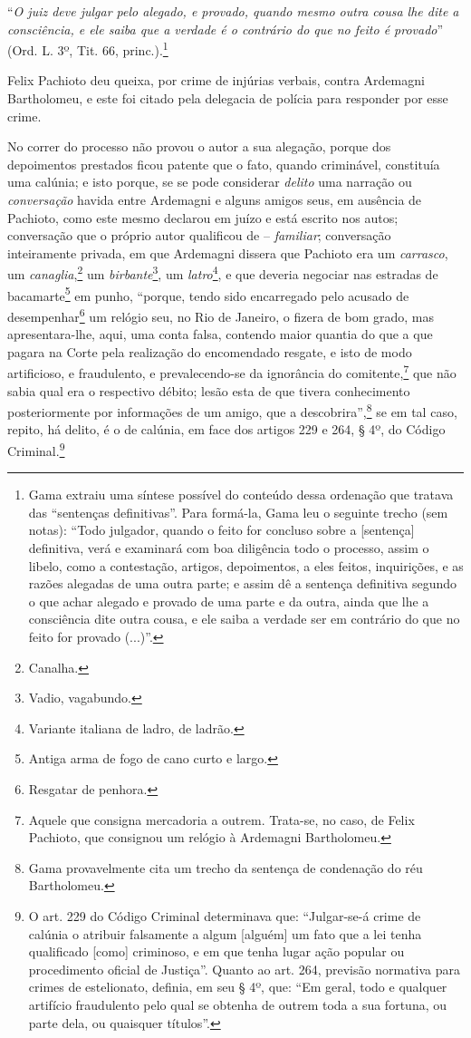 {\asterisc{}

``\emph{O juiz deve julgar pelo alegado, e provado, quando mesmo outra
cousa lhe dite a consciência, e ele saiba que a verdade é o contrário do
que no feito é provado}'' (Ord. L. 3º, Tit. 66, princ.).\footnote{ Gama
  extraiu uma síntese possível do conteúdo dessa ordenação que tratava
  das ``sentenças definitivas''. Para formá-la, Gama leu o seguinte trecho
  (sem notas): ``Todo julgador, quando o feito for concluso sobre a
  {[}sentença{]} definitiva, verá e examinará com boa diligência todo o
  processo, assim o libelo, como a contestação, artigos, depoimentos, a
  eles feitos, inquirições, e as razões alegadas de uma outra parte; e
  assim dê a sentença definitiva segundo o que achar alegado e provado
  de uma parte e da outra, ainda que lhe a consciência dite outra cousa,
  e ele saiba a verdade ser em contrário do que no feito for provado
  (...)''.}

Felix Pachioto deu queixa, por crime de injúrias verbais, contra
Ardemagni Bartholomeu, e este foi citado pela delegacia de polícia para
responder por esse crime.

No correr do processo não provou o autor a sua alegação, porque dos
depoimentos prestados ficou patente que o fato, quando criminável,
constituía uma calúnia; e isto porque, se se pode considerar
\emph{delito} uma narração ou \emph{conversação} havida entre Ardemagni
e alguns amigos seus, em ausência de Pachioto, como este mesmo declarou
em juízo e está escrito nos autos; conversação que o próprio autor
qualificou de -- \emph{familiar}; conversação inteiramente privada, em
que Ardemagni dissera que Pachioto era um \emph{carrasco}, um
\emph{canaglia},\footnote{ Canalha.} um \emph{birbante}\footnote{
  Vadio, vagabundo.}, um \emph{latro}\footnote{ Variante italiana de
  ladro, de ladrão.}, e que deveria negociar nas estradas de
bacamarte\footnote{ Antiga arma de fogo de cano curto e largo.} em
punho, ``porque, tendo sido encarregado pelo acusado de
desempenhar\footnote{ Resgatar de penhora.} um relógio seu, no Rio de
Janeiro, o fizera de bom grado, mas apresentara-lhe, aqui, uma conta
falsa, contendo maior quantia do que a que pagara na Corte pela
realização do encomendado resgate, e isto de modo artificioso, e
fraudulento, e prevalecendo-se da ignorância do comitente,\footnote{
  Aquele que consigna mercadoria a outrem. Trata-se, no caso, de Felix
  Pachioto, que consignou um relógio à Ardemagni Bartholomeu.} que não
sabia qual era o respectivo débito; lesão esta de que tivera
conhecimento posteriormente por informações de um amigo, que a
descobrira'',\footnote{ Gama provavelmente cita um trecho da sentença de
  condenação do réu Bartholomeu.} se em tal caso, repito, há delito, é o
de calúnia, em face dos artigos 229 e 264, § 4º, do Código
Criminal.\footnote{ O art. 229 do Código Criminal determinava que:
  ``Julgar-se-á crime de calúnia o atribuir falsamente a algum
  {[}alguém{]} um fato que a lei tenha qualificado {[}como{]} criminoso,
  e em que tenha lugar ação popular ou procedimento oficial de Justiça''.
  Quanto ao art. 264, previsão normativa para crimes de estelionato,
  definia, em seu § 4º, que: ``Em geral, todo e qualquer artifício
  fraudulento pelo qual se obtenha de outrem toda a sua fortuna, ou
  parte dela, ou quaisquer títulos''.}

}
